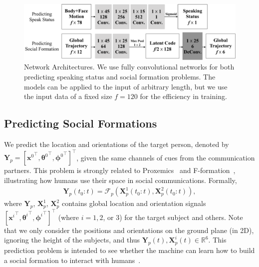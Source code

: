 

\begin{figure}[t]
	\includegraphics[width=\linewidth]{ssp_fig/ssp_imp_detail.pdf}
	\caption{Network Architectures. We use fully convolutional networks for both predicting speaking status and social formation problems. The models can be applied to the input of arbitrary length, but we use the input data of a fixed size $f=120$ for the efficiency in training.}
	\label{fig:ssp_imp_detail}
\end{figure}


\subsection{Predicting Social Formations}
We predict the location and orientations of the target person, denoted by $\mathbf{Y}_p = [{\mathbf{x}^0}^{\top}, {\boldsymbol{\theta}^{0}}^{\top}, {\boldsymbol{\phi}^{0}}^{\top} ]^{\top}$, given the same channels of cues from the communication partners. This problem is strongly related to Proxemics~\cite{Hall66} and F-formation~\cite{kendon90}, illustrating how humans use their space in social communications. Formally, 
\begin{gather}	
 \mathbf{Y}_p (t_0:t) = \mathcal{F}_p \left( \mathbf{X}_p^1(t_0:t), \mathbf{X}_p^2(t_0:t) \right),
 \label{eq:pred_formation}
\end{gather}
where $\mathbf{Y}_p$, $\mathbf{X}_p^1$, $\mathbf{X}_p^2$ contains global location and orientation signals $[{\mathbf{x}^i}^{\top}, {\boldsymbol{\theta}^{i}}^{\top}, {\boldsymbol{\phi}^{i}}^{\top} ]^{\top}$ (where $i=1,2$, or $3$) for the target subject and others.
Note that we only consider the positions and orientations on the ground plane (in 2D), ignoring the height of the subjects, and thus $\mathbf{Y}_p(t), \mathbf{X}_p^i(t) \in \mathbb{R}^6$. This prediction problem is intended to see whether the machine can learn how to build a social formation to interact with humans~\cite{vazquez2017towards}.

